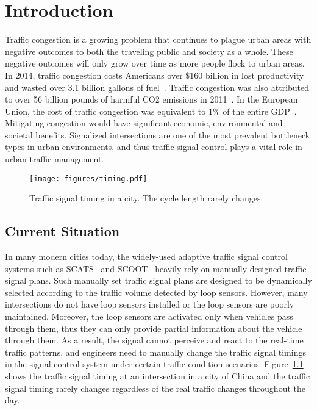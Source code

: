 
\chapter{Introduction}
\label{sec:introduction}
Traffic congestion is a growing problem that continues to plague urban areas with negative outcomes to both the traveling public and society as a whole. These negative outcomes will only grow over time as more people flock to urban areas. In 2014, traffic congestion costs Americans over \$160 billion in lost productivity and wasted over 3.1 billion gallons of fuel~\cite{Econ14}. Traffic congestion was also attributed to over 56 billion pounds of harmful CO2 emissions in 2011~\cite{schrank20152015}. 
In the European Union, the cost of traffic congestion was equivalent to 1\% of the entire GDP~\cite{schrank2012tti}.
Mitigating congestion would have significant economic, environmental and societal benefits.
Signalized intersections are one of the most prevalent bottleneck types in urban environments, and thus traffic signal control plays a vital role in urban traffic management.

\begin{figure}[htbp]
\centering
\texttt{[image: figures/timing.pdf]} 
\caption{Traffic signal timing in a city. The cycle length rarely changes.}
\label{fig:timing}
\end{figure}


\section{Current Situation}
In many modern cities today, the widely-used adaptive traffic signal control systems such as SCATS~\cite{SCATS} and SCOOT~\cite{hunt1981scoot,hunt1982scoot} heavily rely on manually designed traffic signal plans. Such manually set traffic signal plans are designed to be dynamically selected according to the traffic volume detected by loop sensors. However, many intersections do not have loop sensors installed or the loop sensors are poorly maintained. Moreover, the loop sensors are activated only when vehicles pass through them, thus they can only provide partial information about the vehicle through them. As a result, the signal cannot perceive and react to the real-time traffic patterns, and engineers need to manually change the traffic signal timings in the signal control system under certain traffic condition scenarios. Figure~\ref{fig:timing} shows the traffic signal timing at an intersection in a city of China and the traffic signal timing rarely changes regardless of the real traffic changes throughout the day.


